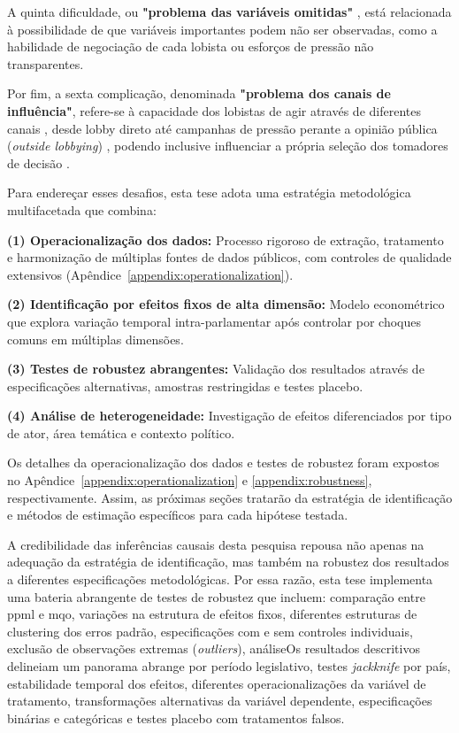 A quinta dificuldade, ou \textbf{"problema das variáveis omitidas"} \cite{de_figueiredo_advancing_2014}, está relacionada à possibilidade de que variáveis importantes podem não ser observadas, como a habilidade de negociação de cada lobista ou esforços de pressão não transparentes.

Por fim, a sexta complicação, denominada \textbf{"problema dos canais de influência"}, refere-se à capacidade dos lobistas de agir através de diferentes canais \cite{dur_measuring_2008}, desde lobby direto até campanhas de pressão perante a opinião pública (\textit{outside lobbying}) \cite{kollman1998outside}, podendo inclusive influenciar a própria seleção dos tomadores de decisão \cite{fordham2003selection}.

Para endereçar esses desafios, esta tese adota uma estratégia metodológica multifacetada que combina:

\textbf{(1) Operacionalização dos dados:} Processo rigoroso de extração, tratamento e harmonização de múltiplas fontes de dados públicos, com controles de qualidade extensivos (Apêndice~\ref{appendix:operationalization}).

\textbf{(2) Identificação por efeitos fixos de alta dimensão:} Modelo econométrico que explora variação temporal intra-parlamentar após controlar por choques comuns em múltiplas dimensões.

\textbf{(3) Testes de robustez abrangentes:} Validação dos resultados através de especificações alternativas, amostras restringidas e testes placebo.

\textbf{(4) Análise de heterogeneidade:} Investigação de efeitos diferenciados por tipo de ator, área temática e contexto político.

Os detalhes da operacionalização dos dados e testes de robustez foram expostos no Apêndice~\ref{appendix:operationalization} e \ref{appendix:robustness}, respectivamente. Assim, as próximas seções tratarão da estratégia de identificação e métodos de estimação específicos para cada hipótese testada.






A credibilidade das inferências causais desta pesquisa repousa não apenas na adequação da estratégia de identificação, mas também na robustez dos resultados a diferentes especificações metodológicas. Por essa razão, esta tese implementa uma bateria abrangente de testes de robustez que incluem: comparação entre \acrshort{ppml} e \acrshort{mqo}, variações na estrutura de efeitos fixos, diferentes estruturas de clustering dos erros padrão, especificações com e sem controles individuais, exclusão de observações extremas (\textit{outliers}), análiseOs resultados descritivos delineiam um panorama abrange por período legislativo, testes \textit{jackknife} por país, estabilidade temporal dos efeitos, diferentes operacionalizações da variável de tratamento, transformações alternativas da variável dependente, especificações binárias e categóricas e testes placebo com tratamentos falsos.

